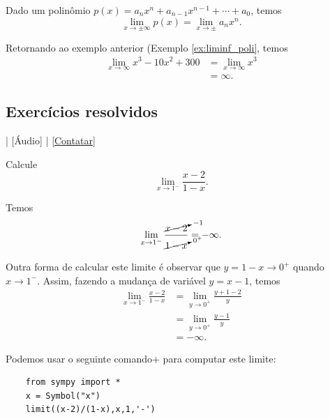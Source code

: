 \begin{prop}
  Dado um polinômio $p(x) = a_nx^n + a_{n-1}x^{n-1} + \cdots + a_0$, temos
  \begin{equation}
    \lim_{x\to \pm\infty} p(x) = \lim_{x\to\pm} a_nx^n.
  \end{equation}
\end{prop}

\begin{ex}
  Retornando ao exemplo anterior (Exemplo \ref{ex:liminf_poli}, temos
  \begin{align}
    \lim_{x\to \infty} x^3 - 10x^2 + 300 &= \lim_{x\to \infty} x^3\\
                                         &= \infty.
  \end{align}
\end{ex}

\subsection*{Exercícios resolvidos}

\begin{flushright}
  [Vídeo] | [Áudio] | \href{https://phkonzen.github.io/notas/contato.html}{[Contatar]}
\end{flushright}

\begin{exeresol}
  Calcule
  \begin{equation}
    \lim_{x\to 1^-} \frac{x-2}{1-x}. 
  \end{equation}
\end{exeresol}
\begin{resol}
  Temos
  \begin{align}
    \lim_{x\to 1^-} \frac{\cancelto{-1}{x-2}}{\cancelto{0^+}{1-x}} = -\infty.
  \end{align}

  Outra forma de calcular este limite é observar que $y = 1-x\to 0^+$ quando $x\to 1^-$. Assim, fazendo a mudança de variável $y = x-1$, temos
  \begin{align}
    \lim_{x\to 1^-} \frac{x-2}{1-x} &= \lim_{y\to 0^+} \frac{y+1-2}{y}\\
                                    &= \lim_{y\to 0^+} \frac{y-1}{y}\\
                                    &= -\infty.
  \end{align}

  \ifispython
  Podemos usar o seguinte comando{\python}+{\sympy} para computar este limite:
  \begin{lstlisting}
    from sympy import *
    x = Symbol("x")
    limit((x-2)/(1-x),x,1,'-')
  \end{lstlisting}
  \fi
\end{resol}

